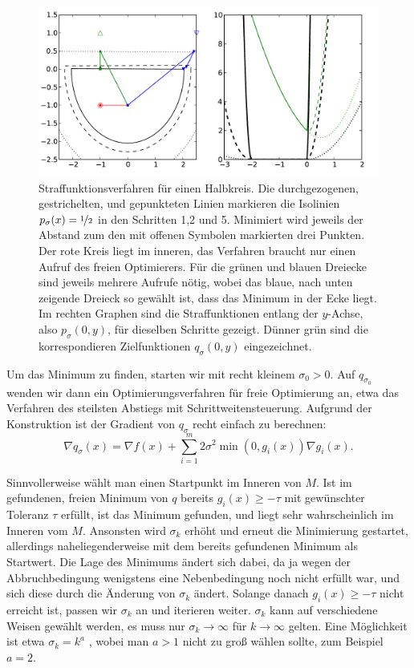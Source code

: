 \begin{figure}
  \centering
  \includegraphics[width=\textwidth]{plots/penalty}
  \caption{Straffunktionsverfahren für einen Halbkreis. Die
    durchgezogenen, gestrichelten, und gepunkteten Linien markieren
    die Isolinien $p_{\sigma}(x)=\nicefrac{1}{2}$ in den Schritten 1,2
    und 5. Minimiert wird jeweils der Abstand zum den mit offenen
    Symbolen markierten drei Punkten. Der rote Kreis liegt im inneren,
    das Verfahren braucht nur einen Aufruf des freien Optimierers. Für
    die grünen und blauen Dreiecke sind jeweils mehrere Aufrufe nötig,
    wobei das blaue, nach unten zeigende Dreieck so gewählt ist, dass
    das Minimum in der Ecke liegt. Im rechten Graphen sind die
    Straffunktionen entlang der $y$-Achse, also $p_{\sigma}(0,y)$, für
    dieselben Schritte gezeigt. Dünner grün sind die korrespondieren
    Zielfunktionen $q_{\sigma}(0,y)$ eingezeichnet.}
  \label{fig:penalty}
\end{figure}

Um das Minimum zu finden, starten wir mit recht kleinem
$\sigma_0>0$. Auf $q_{\sigma_0}$ wenden wir dann ein
Optimierungsverfahren für freie Optimierung an, etwa das Verfahren des
steilsten Abstiegs mit Schrittweitensteuerung. Aufgrund der
Konstruktion ist der Gradient von $q_{\sigma}$ recht einfach zu berechnen:
\begin{equation}
  \nabla q_{\sigma}(x) = \nabla f(x) + \sum_{i=1}^m 2\sigma^2\min(0,
  g_i(x))\nabla g_i(x).
\end{equation}

Sinnvollerweise wählt man einen Startpunkt im Inneren von $M$. Ist im
gefundenen, freien Minimum von $q$ bereits $g_i(x)\ge - \tau$ mit
gewünschter Toleranz $\tau$ erfüllt, ist das Minimum gefunden, und
liegt sehr wahrscheinlich im Inneren vom $M$. Ansonsten wird
$\sigma_k$ erhöht und erneut die Minimierung gestartet, allerdings
naheliegenderweise mit dem bereits gefundenen Minimum als
Startwert. Die Lage des Minimums ändert sich dabei, da ja wegen der
Abbruchbedingung wenigstens eine Nebenbedingung noch nicht erfüllt
war, und sich diese durch die Änderung von $\sigma_k$ ändert. Solange
danach $g_i(x)\ge - \tau$ nicht erreicht ist, passen wir $\sigma_k$ an
und iterieren weiter.
$\sigma_k$ kann auf verschiedene Weisen gewählt werden, es muss nur
$\sigma_k\to \infty$ für $k\to\infty$ gelten. Eine Möglichkeit ist
etwa $\sigma_k=k^a$ , wobei man $a>1$ nicht zu groß wählen sollte, zum
Beispiel $a=2$.

